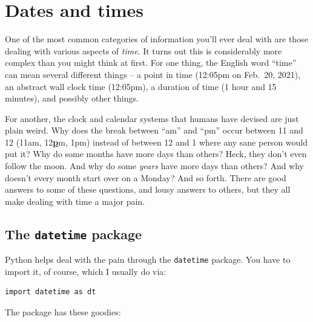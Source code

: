 \chapter{Dates and times}


One of the most common categories of information you'll ever deal with are
those dealing with various aspects of \textit{time}. It turns out this is
considerably more complex than you might think at first. For one thing, the
English word ``time'' can mean several different things -- a point in time
(12:05pm on Feb.~20, 2021), an abstract wall clock time (12:05pm), a duration
of time (1 hour and 15 minutes), and possibly other things.

For another, the clock and calendar systems that humans have devised are just
plain weird. Why does the break between ``am'' and ``pm'' occur between 11 and
12 (11am, 12\underline{\textbf{p}}m, 1pm) instead of between 12 and 1 where any
sane person would put it? Why do some months have more days than others? Heck,
they don't even follow the moon. And why do some \textit{years} have more days
than others? And why doesn't every month start over on a Monday? And so forth.
There are good answers to some of these questions, and lousy answers to others,
but they all make dealing with time a major pain.

\section{The \texttt{datetime} package}


Python helps deal with the pain through the \texttt{datetime} package. You have
to import it, of course, which I usually do via:

\begin{Verbatim}[fontsize=\small,samepage=true,frame=single,framesep=3mm]
import datetime as dt
\end{Verbatim}

The package has these goodies:

